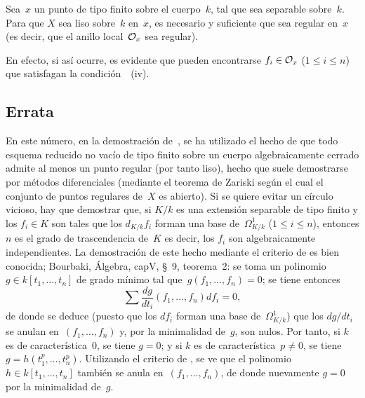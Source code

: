 \begin{corollaire}
\label{II.5.10}
Sea~$x$ un punto
de tipo finito sobre el cuerpo~$k$, tal que
sea separable sobre~$k$. Para que $X$ sea liso sobre~$k$ en~$x$, es necesario y suficiente que sea regular en~$x$ (es decir, que el anillo local~$\cal{O}_x$ sea regular).
\end{corollaire}

En efecto, si así ocurre, es evidente que pueden encontrarse $f_i\in\cal{O}_x$ ($1\leq i\leq n$) que satisfagan la condición~~(iv).

\subsection*{Errata}
\label{II.fin.errata}
En
este número, en la demostración de~, se ha utilizado el hecho de que todo esquema reducido no vacío de tipo finito sobre un cuerpo algebraicamente cerrado admite al menos un punto regular (por tanto liso), hecho que suele demostrarse por métodos diferenciales (mediante el teorema de Zariski según el cual el conjunto de puntos regulares de~$X$ es abierto). Si se quiere evitar un círculo vicioso, hay que demostrar que, si $K/k$ es una extensión separable de tipo finito y los $f_i\in K$ son tales que los $d_{K/k}f_i$ forman una base de~$\Omega^1_{K/k}$ ($1\leq i\leq n$), entonces $n$ es el grado de trascendencia de~$K$
es decir, los $f_i$ son algebraicamente independientes. La demostración de este hecho mediante el criterio de
es bien conocida; \cf Bourbaki, Álgebra, cap\ptbl V, §~9, teorema~2: se toma un polinomio~$g\in k[t_1,\dots,t_n]$ de grado mínimo tal que~$g(f_1,\dots,f_n)=0$; se tiene entonces
\[
\sum\frac{dg}{d t_i}(f_1,\dots,f_n)df_i=0,
\]
de donde se deduce (puesto que los $df_i$ forman una base de~$\Omega^1_{K/k}$) que los $dg/dt_i$ se anulan en~$(f_1,\dots,f_n)$ y, por la minimalidad de~$g$, son nulos. Por tanto, si $k$ es de característica~$0$, se tiene $g=0$; y si $k$ es de característica~$p\neq0$, se tiene $g=h(t_1^p,\dots,t_n^p)$. Utilizando el criterio de
,
se ve que el polinomio~$h\in k[t_1,\dots,t_n]$ también se anula en~$(f_1,\dots,f_n)$, de donde nuevamente $g=0$ por la minimalidad de~$g$.
